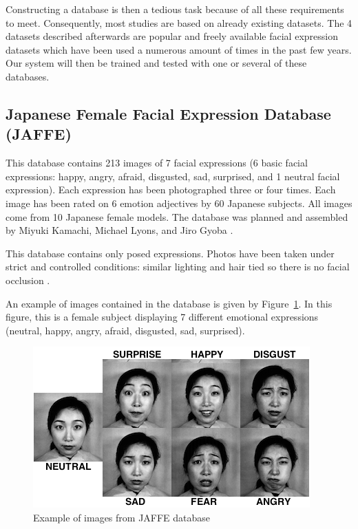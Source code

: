 \noindent Constructing a database is then a tedious task because of all these requirements to meet. Consequently, most studies are based on already existing datasets. The 4 datasets described afterwards are popular and freely available facial expression datasets which have been used a numerous amount of times in the past few years. Our system will then be trained and tested with one or several of these databases.
\newline

\subsection{Japanese Female Facial Expression Database (JAFFE)}

\vspace{\baselineskip}
\noindent This database contains 213 images of 7 facial expressions (6 basic facial expressions: happy, angry, afraid, disgusted, sad, surprised, and 1 neutral facial expression). Each expression has been photographed three or four times. Each image has been rated on 6 emotion adjectives by 60 Japanese subjects. All images come from 10 Japanese female models.  The database was planned and assembled by Miyuki Kamachi, Michael Lyons, and Jiro Gyoba \cite{JAFFE}.
\newline

\noindent This database contains only posed expressions. Photos have been taken under strict  and controlled conditions: similar lighting and hair tied so there is no facial occlusion \cite{BET12}. 
\newline

\noindent An example of images contained in the database is given by Figure~\ref{jaffe_7facialexpressions}. In this figure, this is a female subject displaying 7 different emotional expressions (neutral, happy, angry, afraid, disgusted, sad, surprised). 
\newline

\begin{figure}[!h]
\begin{center}
\noindent \includegraphics[scale=0.75]{figures/jaffe_7facialexpressions} 
\newline
\caption{Example of images from JAFFE database}
\label{jaffe_7facialexpressions}
\end{center} 
\end{figure}

